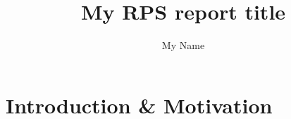 \documentclass{SVNITPhDrpsPB}
\author{My Name} %
\title{My RPS report title} %
\begin{document}
\addpageborder

\maketitle

\setcounter{page}{2}

\putTableAdmin{}

\putTableTech{}

\putdecleration

\putapproval

\putsvnitack{

}



\putsvnitabstract{

}

\tableofcontents\newpage

\listoffigures\newpage

\listoftables\newpage

\clearpageborder

\setcounter{page}{1}


\chapter{Introduction \& Motivation}




\nocite{*}
\end{document}
